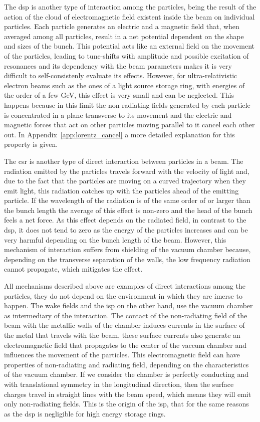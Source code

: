     The \gls{dsp} is another type of interaction among the particles, being the result of the action of the cloud of electromagnetic field existent inside the beam on individual particles. Each particle generates an electric and a magnetic field that, when averaged among all particles, result in a net potential dependent on the shape and sizes of the bunch. This potential acts like an external field on the movement of the particles, leading to tune-shifts with amplitude and possible excitation of resonances and its dependency with the beam parameters makes it is very difficult to self-consistenly evaluate its effects. However, for ultra-relativistic electron beams such as the ones of a light source storage ring, with energies of the order of a few \si{\giga\electronvolt}, this effect is very small and can be neglected. This happens because in this limit the non-radiating fields generated by each particle is concentrated in a plane transverse to its movement and the electric and magnetic forces that act on other particles moving parallel to it cancel each other out. In Appendix~\ref{app:lorentz_cancel} a more detailed explanation for this property is given.

    The \gls{csr} is another type of direct interaction between particles in a beam. The radiation emitted by the particles travels forward with the velocity of light and, due to the fact that the particles are moving on a curved trajectory when they emit light, this radiation catches up with the particles ahead of the emitting particle. If the wavelength of the radiation is of the same order of or larger than the bunch length the average of this effect is non-zero and the head of the bunch feels a net force. As this effect depends on the radiated field, in contrast to the \gls{dsp}, it does not tend to zero as the energy of the particles increases and can be very harmful depending on the bunch length of the beam. However, this mechanism of interaction suffers from shielding of the vacuum chamber because, depending on the transverse separation of the walls, the low frequency radiation cannot propagate, which mitigates the effect.

    All mechanisms described above are examples of direct interactions among the particles, they do not depend on the environment in which they are imerse to happen. The wake fields and the \gls{isp} on the other hand, use the vacuum chamber as intermediary of the interaction. The contact of the non-radiating field of the beam with the metallic walls of the chamber induces currents in the surface of the metal that travels with the beam, these surface currents also generate an electromagnetic field that propagates to the center of the vaccum chamber and influences the movement of the particles. This electromagnetic field can have properties of non-radiating and radiating field, depending on the characteristics of the vacuum chamber. If we consider the chamber is perfectly conducting and with translational symmetry in the longitudinal direction, then the surface charges travel in straight lines with the beam speed, which means they will emit only non-radiating fields. This is the origin of the \gls{isp}, that for the same reasons as the \gls{dsp} is negligible for high energy storage rings.

